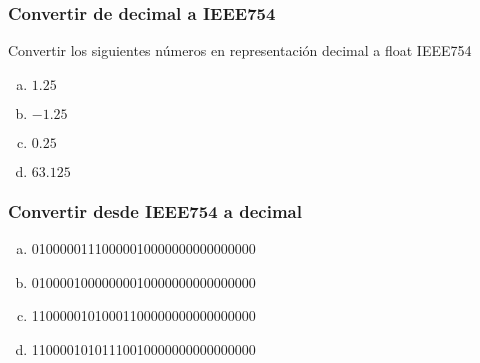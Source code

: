 \subsubsection{Convertir de decimal a IEEE754}
Convertir los siguientes números en representación decimal a float IEEE754
\begin{enumerate}[a)]
  \item $1.25$
  \item $-1.25$
  \item $0.25$
  \item $63.125$
\end{enumerate}

\subsubsection{Convertir desde IEEE754 a decimal}
\begin{enumerate}[a)]
  \item 01000001110000010000000000000000
  \item 01000010000000010000000000000000
  \item 11000001010001100000000000000000
  \item 11000010101110010000000000000000
\end{enumerate}

